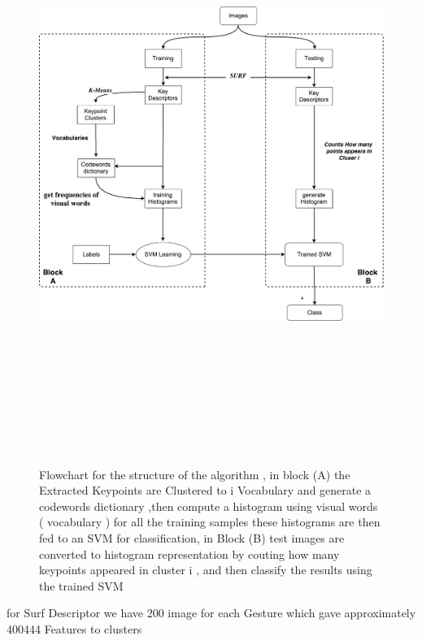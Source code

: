 \begin{figure}[!h]
\centering
\includegraphics[width=17cm, height=19.5cm ]{img/myalgo.pdf}
\caption{Flowchart for the structure of the algorithm , in block (A) the Extracted Keypoints  are Clustered to i Vocabulary and generate a codewords dictionary  ,then compute a histogram using visual words ( vocabulary ) for all the training samples these histograms are then fed to an SVM for classification, in Block (B) test images are converted to histogram representation by couting how many keypoints appeared in cluster i ,  and then classify the results using the trained SVM }
\label{fig:algo1}
\end{figure}

\newpage

for Surf Descriptor we have 200 image for each Gesture  which gave approximately 400444 Features to clusters 

